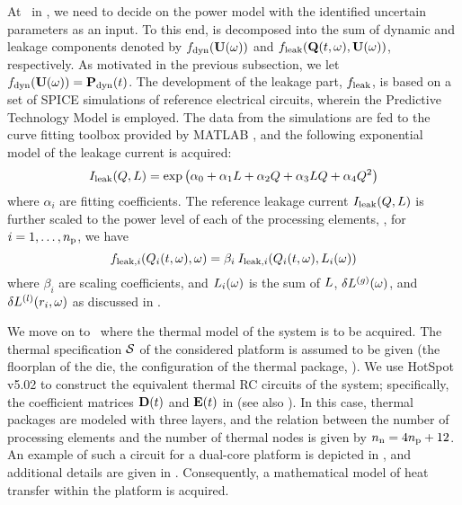 At \ in , we need to decide on the power model with the identified uncertain parameters as an input.
To this end,  is decomposed into the sum of dynamic and leakage components denoted by $f_{\text{dyn}}(\mathbf{U}(\omega))$ and $f_{\text{leak}}(\mathbf{Q}(t, \omega), \mathbf{U}(\omega))$, respectively.
As motivated in the previous subsection, we let $f_{\text{dyn}}(\mathbf{U}(\omega)) = \mathbf{P}_{\text{dyn}}(t)$.
The development of the leakage part, $f_{\text{leak}}$, is based on a set of SPICE simulations of reference electrical circuits, wherein the Predictive Technology Model \cite{ptm} is employed. The data from the simulations are fed to the curve fitting toolbox provided by MATLAB \cite{matlab}, and the following exponential model of the leakage current is acquired:
\begin{equation} \elabel{leakage-current}
  I_\leak(\T, \Leff) = \exp \left( \alpha_0 + \alpha_1 \Leff + \alpha_2 \T + \alpha_3 \Leff \T + \alpha_4 \T^2 \right)
\end{equation}
where $\alpha_i$ are fitting coefficients. The reference leakage current $I_{\text{leak}}(Q, L)$ is further scaled to the power level of each of the processing elements, \ie, for $i = 1, \dotsc, {n_\text{p}}$, we have
\[
  f_{\text{leak}, i}(Q_i(t, \omega), \omega) = \beta_i \: I_{\text{leak}, i}(Q_i(t, \omega), L_i(\omega))
\]
where $\beta_i$ are scaling coefficients, and $L_i(\omega)$ is the sum of $L$, ${\delta L^{(g)}}(\omega)$, and $\delta L^{(l)}(r_i, \omega)$ as discussed in .

We move on to \ where the thermal model of the system is to be acquired. The thermal specification $\mathcal{S}$ of the considered platform is assumed to be given (the floorplan of the die, the configuration of the thermal package, \etc).
We use HotSpot v5.02 \cite{hotspot} to construct the equivalent thermal RC circuits of the system; specifically, the coefficient matrices $\mCF(\t)$ and $\mCS(\t)$ in  (see also ).
In this case, thermal packages are modeled with three layers, and the relation between the number of processing elements and the number of thermal nodes is given by ${n_\text{n}} = 4 {n_\text{p}} + 12$.
An example of such a circuit for a dual-core platform is depicted in , and additional details are given in .
Consequently, a mathematical model of heat transfer within the platform is acquired.
